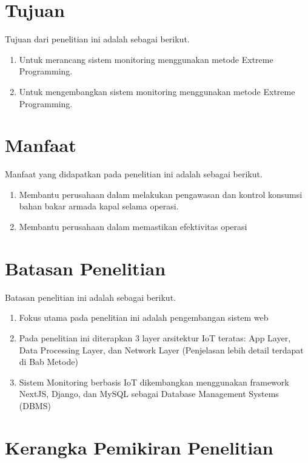 \section{Tujuan}

\noindent Tujuan dari penelitian ini adalah sebagai berikut.

\begin{enumerate}
    \item Untuk merancang sistem monitoring menggunakan metode Extreme Programming.
    \item Untuk mengembangkan sistem monitoring menggunakan metode Extreme Programming.
\end{enumerate}

\section{Manfaat}

\noindent Manfaat yang didapatkan pada penelitian ini adalah sebagai berikut.

\begin{enumerate}
    \item Membantu perusahaan dalam melakukan pengawasan dan kontrol konsumsi bahan bakar armada kapal selama operasi.
    \item Membantu perusahaan dalam memastikan efektivitas operasi  
\end{enumerate}


\section{Batasan Penelitian}

\noindent Batasan penelitian ini adalah sebagai berikut.

\begin{enumerate}
    \item Fokus utama pada penelitian ini adalah pengembangan sistem web
    \item Pada penelitian ini diterapkan 3 layer arsitektur IoT teratas: App Layer, Data Processing Layer, dan Network Layer (Penjelasan lebih detail terdapat di Bab Metode)
    \item Sistem Monitoring berbasis IoT dikembangkan menggunakan framework NextJS, Django, dan MySQL sebagai Database Management Systems (DBMS)
\end{enumerate}
\section{Kerangka Pemikiran Penelitian}


